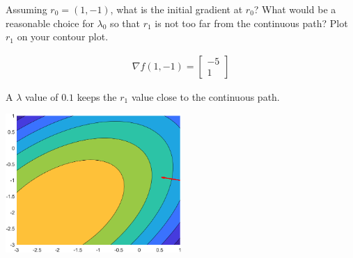 Assuming $r_0 = (1, -1)$, what is the initial gradient at $r_0$? What would be a reasonable choice for $\lambda_0$ so that $r_1$ is not too far from the continuous path? Plot $r_1$ on your contour plot.

\begin{solution}
\begin{align*}
    \nabla f(1, -1) = \begin{bmatrix}
        -5 \\ 1
    \end{bmatrix}
\end{align*}

A $\lambda$ value of $0.1$ keeps the $r_1$ value close to the continuous path.

\begin{center}
    \includegraphics[width=0.5\textwidth]{img/e7p4.png}
\end{center}
\end{solution}